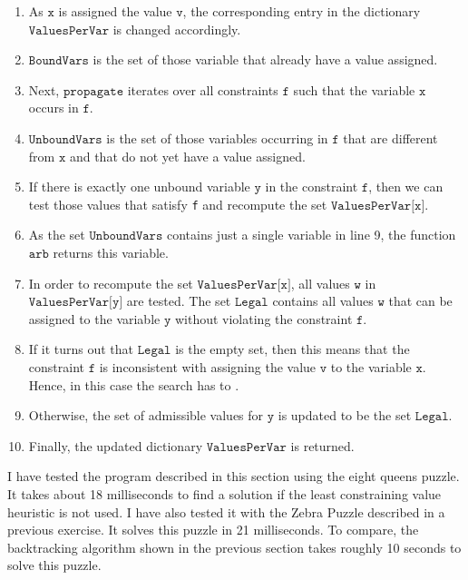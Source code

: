 \begin{enumerate}
\item As $\texttt{x}$ is assigned the value $\texttt{v}$, the corresponding entry in the dictionary
      $\texttt{ValuesPerVar}$ is changed accordingly. 
\item $\texttt{BoundVars}$ is the set of those variable that already have a value assigned.
\item Next, $\texttt{propagate}$ iterates over all  constraints $\texttt{f}$ such that the variable
      $\texttt{x}$ occurs in $\texttt{f}$.
\item $\texttt{UnboundVars}$ is the set of those variables occurring in $\texttt{f}$ that are different from
      $\texttt{x}$ and that do not yet have a value assigned.  
\item If there is exactly one unbound variable $\texttt{y}$ in the constraint $\texttt{f}$, then we can test
      those values that satisfy \texttt{f} and recompute the set $\texttt{ValuesPerVar[x]}$.
\item As the set $\texttt{UnboundVars}$ contains just a single variable in line 9,
      the function $\texttt{arb}$ returns this variable.
\item In order to recompute the set $\texttt{ValuesPerVar[x]}$,  all values $\texttt{w}$ in
      $\texttt{ValuesPerVar[y]}$ are tested.  The set $\texttt{Legal}$ contains all values $\texttt{w}$ that can
      be assigned to the variable $\texttt{y}$ without violating the constraint $\texttt{f}$.
\item If it turns out that $\texttt{Legal}$ is the empty set, then this means that the constraint
      $\texttt{f}$ is inconsistent with assigning the value $\texttt{v}$ to the variable
      $\texttt{x}$.  Hence, in this case the  search has to  .
\item Otherwise, the set of admissible values for $\texttt{y}$ is updated to be the set $\texttt{Legal}$.
\item Finally, the updated dictionary $\texttt{ValuesPerVar}$ is returned.
\end{enumerate}
I have tested the program described in this section using the eight queens puzzle.  It takes about
18 milliseconds to find a solution if the least constraining value heuristic is not used.  I have also tested
it with the Zebra Puzzle described in a previous exercise.  It solves this puzzle in 21 milliseconds.  To
compare, the backtracking algorithm shown in the previous section takes roughly 10 seconds to solve this puzzle.


